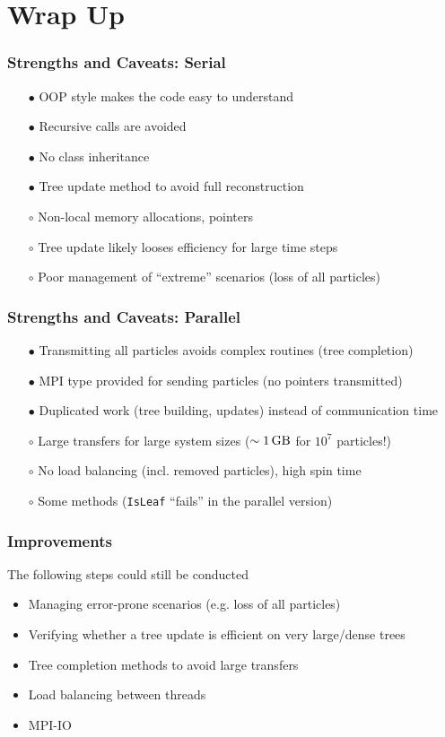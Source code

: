 \section{Wrap Up}

\begin{frame}
	\frametitle{Strengths and Caveats: Serial}
	\begin{itemize}
		\item[$\bullet$] OOP style makes the code easy to understand
		\item[$\bullet$] Recursive calls are avoided
		\item[$\bullet$] No class inheritance
		\item[$\bullet$] Tree update method to avoid full reconstruction
		\pause
		\item[$\circ$] Non-local memory allocations, pointers
		\item[$\circ$] Tree update likely looses efficiency for large time steps
		\item[$\circ$] Poor management of ``extreme'' scenarios (loss of all particles)
	\end{itemize}
\end{frame}

\begin{frame}[fragile]
\frametitle{Strengths and Caveats: Parallel}
	\begin{itemize}
		\item[$\bullet$] Transmitting all particles avoids complex routines (tree completion)
		\item[$\bullet$] MPI type provided for sending particles (no pointers transmitted)
		\item[$\bullet$] Duplicated work (tree building, updates) instead of communication time
		\item[$\circ$] Large transfers for large system sizes ($\sim\SI{1}{\giga\byte}$ for $10^7$ particles!)
		\item[$\circ$] No load balancing (incl. removed particles), high spin time
		\item[$\circ$] Some methods (\lstinline|IsLeaf| ``fails'' in the parallel version)
	\end{itemize}
\end{frame}

\begin{frame}
\frametitle{Improvements}
	The following steps could still be conducted
	\begin{itemize}
		\item Managing error-prone scenarios (e.g. loss of all particles)
		\item Verifying whether a tree update is efficient on very large/dense trees
		\item Tree completion methods to avoid large transfers
		\item Load balancing between threads
		\item MPI-IO
	\end{itemize}
\end{frame}